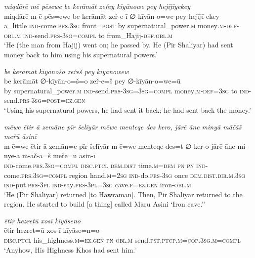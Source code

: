 \ea \label{ŽP.109}
\textit{miqdārē mē pēsewe be kerāmāt zeřey kīyānowe pey hejījīyekey} \\ 
\gll miqdārē m-ē pēs=ewe be kerāmāt zeř-e-ī ∅-kīyān-o=we pey hejījī-ekey \\ 
 a\_little \textsc{ind-}come\textsc{.prs}\textsc{.3sg} front\textsc{=\textsc{post}} by supernatural\_power\textsc{.m} money\textsc{.m}\textsc{-def}\textsc{-obl}\textsc{.m} \textsc{ind-}send\textsc{.prs}\textsc{-3sg}\textsc{=compl} to from\_Hajij\textsc{-def}\textsc{.obl}\textsc{.m} \\ 
\glt `He (the man from Hajij) went on; he passed by. He (Pir Shaliyar) had sent money back to him using his supernatural powers.'
\z 
 
\ea \label{ŽP.110}
\textit{be kerāmāt kīyānošo zeřeš pey kīyānowew} \\ 
\gll be kerāmāt ∅-kīyān-o=š=o zeř-e=š pey ∅-kīyān-o=we=ū \\ 
 by supernatural\_power\textsc{.m} \textsc{ind-}send\textsc{.prs}\textsc{-3sg}\textsc{=3sg}\textsc{=compl} money\textsc{.m}\textsc{-def}\textsc{=3sg} to \textsc{ind-}send\textsc{.prs}\textsc{-3sg}\textsc{=\textsc{post}}\textsc{\textsc{=ez.gen}} \\ 
\glt `Using his supernatural powers, he had sent it back; he had sent back the money.'
\z 
 
\ea \label{ŽP.116}
\textit{mēwe ētir ā zemāne pīr šelīyār mēwe menteqe des kero, jārē āne minyā māčāš meřū āsinī} \\ 
\gll m-ē=we ētir ā zemān=e pīr šelīyār m-ē=we menteqe des=t ∅-ker-o jārē āne mi-nye-ā m-āč-ā=š meře=ū āsin-ī \\ 
 \textsc{ind-}come\textsc{.prs}\textsc{.3sg}\textsc{=compl} \textsc{disc.ptcl} \textsc{dem.dist} time\textsc{.m}\textsc{=dem} \textsc{pn} \textsc{pn} \textsc{ind-}come\textsc{.prs}\textsc{.3sg}\textsc{=compl} region hand\textsc{.m}\textsc{=\textsc{2sg}} \textsc{ind-}do\textsc{.prs}\textsc{-3sg} once \textsc{dem.dist}\textsc{.dir}\textsc{.m}\textsc{.3sg} \textsc{ind-}put\textsc{.prs}\textsc{-3pl} \textsc{ind-}say\textsc{.prs}\textsc{-3pl}\textsc{=3sg} cave\textsc{.f}\textsc{\textsc{=ez.gen}} iron\textsc{-obl}\textsc{.m} \\ 
\glt `He (Pir Shaliyar) returned [to Hawraman]. Then, Pir Shaliyar returned to the region. He started to build [a thing] called Maru Asini ‘Iron cave.’'
\z 
 
\ea \label{ŽP.117}
\textit{ētir hezretū xosī kīyāseno} \\ 
\gll ētir hezret=ū xos-ī kīyāse=n=o \\ 
 \textsc{disc.ptcl} his\_highness\textsc{.m}\textsc{\textsc{=ez.gen}} \textsc{pn}\textsc{-obl}\textsc{.m} send\textsc{.pst}\textsc{.ptcp}\textsc{.m}\textsc{=cop}\textsc{.3sg}\textsc{.m}\textsc{=compl} \\ 
\glt `Anyhow, His Highness Khos had sent him.'
\z 
 
